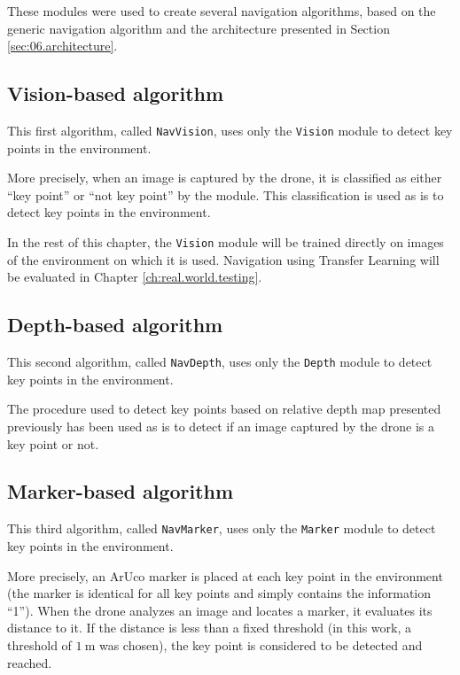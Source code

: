 These modules were used to create several navigation algorithms, based on the generic navigation algorithm and the architecture presented in Section \ref{sec:06.architecture}.

\subsection{Vision-based algorithm}

This first algorithm, called \texttt{NavVision}, uses only the \texttt{Vision} module to detect key points in the environment.

More precisely, when an image is captured by the drone, it is classified as either \enquote{key point} or \enquote{not key point} by the module. This classification is used as is to detect key points in the environment.

\begin{note}
    In the rest of this chapter, the \texttt{Vision} module will be trained directly on images of the environment on which it is used. Navigation using Transfer Learning will be evaluated in Chapter \ref{ch:real.world.testing}.
\end{note}

\subsection{Depth-based algorithm}

This second algorithm, called \texttt{NavDepth}, uses only the \texttt{Depth} module to detect key points in the environment.

The procedure used to detect key points based on relative depth map presented previously has been used as is to detect if an image captured by the drone is a key point or not.

\subsection{Marker-based algorithm}

This third algorithm, called \texttt{NavMarker}, uses only the \texttt{Marker} module to detect key points in the environment.

More precisely, an ArUco marker is placed at each key point in the environment (the marker is identical for all key points and simply contains the information \enquote{1}). When the drone analyzes an image and locates a marker, it evaluates its distance to it. If the distance is less than a fixed threshold (in this work, a threshold of $\SI{1}{\meter}$ was chosen), the key point is considered to be detected and reached.

